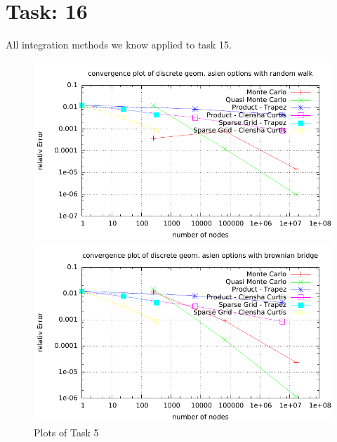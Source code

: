 \documentclass{article}
\begin{document}
\section*{Task: 16}
All integration methods we know applied to task 15.
\begin{figure} [htbp]
	\begin{minipage}[b]{0.5\textwidth} 
    	\includegraphics[width=1\textwidth]{../Task16/sh3_task16_convergence_plot_rw.pdf}
    \end{minipage}
    \begin{minipage}[b]{0.5\textwidth} 
    	\includegraphics[width=1\textwidth]{../Task16/sh3_task16_convergence_plot_bb.pdf}
    \end{minipage}
\caption{Plots of Task 5} 
\end{figure} 
%
\end{document}
